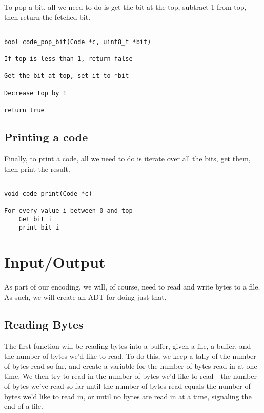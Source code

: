 \documentclass[11pt]{article}
\begin{document}
To pop a bit, all we need to do is get the bit at the top, subtract 1 from top, then return the fetched bit.

\begin{verbatim}

bool code_pop_bit(Code *c, uint8_t *bit)

If top is less than 1, return false

Get the bit at top, set it to *bit

Decrease top by 1

return true

\end{verbatim}

\subsection{Printing a code}

Finally, to print a code, all we need to do is iterate over all the bits, get them, then print the result.

\begin{verbatim}

void code_print(Code *c)

For every value i between 0 and top
    Get bit i
    print bit i

\end{verbatim}

\section{Input/Output}

As part of our encoding, we will, of course, need to read and write bytes to a file. As such, we will create an ADT for doing just that.

\subsection{Reading Bytes}

The first function will be reading bytes into a buffer, given a file, a buffer, and the number of bytes we'd like to read. To do this, we keep a tally of the number of bytes read so far, and create a variable for the number of bytes read in at one time. We then try to read in the number of bytes we'd like to read - the number of bytes we've read so far until the number of bytes read equals the number of bytes we'd like to read in, or until no bytes are read in at a time, signaling the end of a file.
\end{document}
